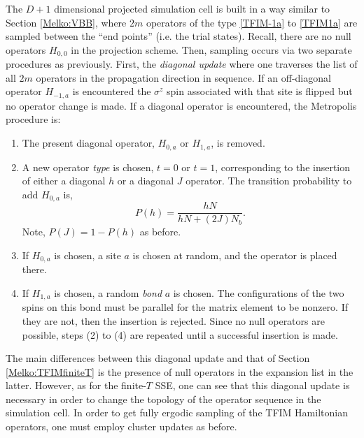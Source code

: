 \documentclass[vecphys]{svmult}
\begin{document}
The $D+1$ dimensional projected simulation cell is built in a way similar to Section \ref{Melko:VBB}, where $2m$ operators of the type \ref{TFIM-1a} to \ref{TFIM1a}  are sampled between the ``end points'' (i.e. the trial states).  Recall, there are no null operators $H_{0,0}$ in the projection scheme.  Then, sampling occurs via two separate procedures as previously.  First, the {\em diagonal update} where one traverses the list of all $2m$ operators in the propagation direction in sequence. If an off-diagonal operator $H_{-1,a}$ is encountered the $\sigma^z$ spin associated with that site is flipped but no operator change is made.  If a diagonal operator is encountered, the Metropolis procedure is:
\begin{enumerate}
\item The present diagonal operator,  $H_{0,a}$ or  $H_{1,a}$, is removed. 
\item A new operator {\em type} is chosen, $t=0$ or $t=1$, corresponding to the insertion of either a diagonal $h$ or a diagonal $J$ operator.  The transition probability to add $H_{0,a}$ is,
\begin{equation}
P(h) = \frac{h N}{hN + (2J)N_b}.
\end{equation}
Note, $P(J) = 1- P(h)$ as before. 
\item If $H_{0,a}$ is chosen, a site $a$ is chosen at random, and the operator is placed there.
\item If $H_{1,a}$ is chosen, a random {\em bond} $a$ is chosen.  The configurations of the two spins on this bond must be parallel for the matrix element to be nonzero.  If they are not, then the insertion is rejected.   Since no null operators are possible, steps (2) to (4) are repeated until a successful insertion is made.
\end{enumerate}
The main differences between this diagonal update and that of Section \ref{Melko:TFIMfiniteT} is the presence of null operators in the expansion list in the latter.  However, as for the finite-$T$ SSE, one can see that this diagonal update is necessary in order to change the topology of the operator sequence in the simulation cell.  In order to get fully ergodic sampling of the TFIM Hamiltonian operators, one must employ cluster updates as before.
\end{document}
